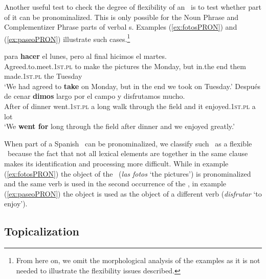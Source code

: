 \documentclass[output=paper]{langsci/langscibook}
\begin{document}
Another useful test to check the degree of flexibility of an \mwe\ is to test whether part of it can be pronominalized.
This is only possible for the Noun Phrase and Complementizer Phrase parts of verbal \mwe s.
Examples (\ref{ex:fotosPRON}) and (\ref{ex:paseoPRON}) illustrate such cases.\footnote{From here on, we omit the morphological analysis of the examples as it is not needed to illustrate the flexibility issues described.}

\begin{exe}
\ex \label{ex:fotosPRON}
 para \textbf{hacer} \textbf{} \textbf{} el lunes, pero al final \textbf{} hicimos el martes.\\
Agreed.to.meet.\textsc{1st.pl} to make the pictures the Monday, but {in.the} end them {made.\textsc{1st.pl}} the Tuesday\\
\glt `We had agreed to \textbf{take } on Monday, but in the end we took \textbf{} on Tuesday.'
\ex \label{ex:paseoPRON}
\gll Después de cenar \textbf{dimos} \textbf{} largo \textbf{} por el campo y \textbf{} disfrutamos mucho. \\
After of dinner {went.\textsc{1st.pl}} a long walk through the field and it {enjoyed.\textsc{1st.pl}} {a lot} \\
\glt `We \textbf{went for } long \textbf{} through the field after dinner and we enjoyed \textbf{} greatly.'
\end{exe}

When part of a Spanish \mwe\ can be pronominalized, we classify such \mwe\ as a flexible \mwe\ because the fact that not all lexical elements are together in the same clause makes its identification and processing more difficult. 
While in example (\ref{ex:fotosPRON}) the object of the \mwe\ (\textit{las fotos} `the pictures') is pronominalized and the same verb is used in the second occurrence of the \mwe, in example (\ref{ex:paseoPRON}) the object is used as the object of a different verb (\textit{disfrutar} `to enjoy').

\subsection{Topicalization}
\label{ssec:topicalization}
\end{document}
